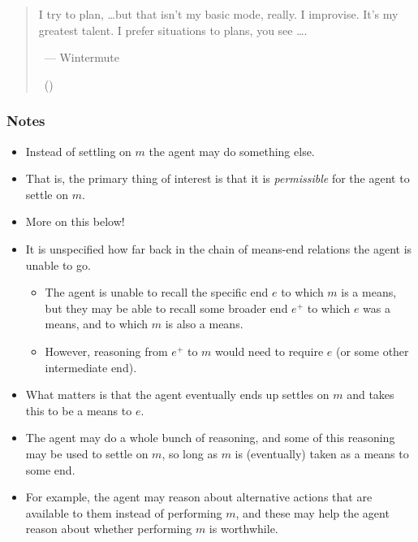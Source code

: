 \documentclass[10pt]{article}
\newcommand{\hozline}[0]{%
  \noindent\hdashrule[0.5ex][c]{\textwidth}{.1pt}{}
}
\newcommand{\hozlinedash}[0]{%
  \noindent\hdashrule[0.5ex][c]{\textwidth}{.1pt}{2.5pt}
}
\begin{document}
\hozlinedash

\begin{quote}
  I try to plan, \dots but that isn't my basic mode, really.
  I improvise.
  It’s my greatest talent.
  I prefer situations to plans, you see \dots.

  \mbox{ }\hfill --- Wintermute

  \mbox{ }\hfill\mbox{(\cite[118]{Gibson:2000aa})}
\end{quote}

\hozline

\subsubsection*{Notes}
\label{sec:notes}

\begin{itemize}
\item Instead of settling on \(m\) the agent may do something else.
\item That is, the primary thing of interest is that it is \emph{permissible} for the agent to settle on \(m\).
\item More on this below!
\end{itemize}


\begin{itemize}
\item It is unspecified how far back in the chain of means-end relations the agent is unable to go.
  \begin{itemize}
  \item The agent is unable to recall the specific end \(e\) to which \(m\) is a means, but they may be able to recall some broader end \(e^{+}\) to which \(e\) was a means, and to which \(m\) is also a means.
  \item However, reasoning from \(e^{+}\) to \(m\) would need to require \(e\) (or some other intermediate end).
  \end{itemize}
\end{itemize}

\begin{itemize}
\item What matters is that the agent eventually ends up settles on \(m\) and takes this to be a means to \(e\).
\item The agent may do a whole bunch of reasoning, and some of this reasoning may be used to settle on \(m\), so long as \(m\) is (eventually) taken as a means to some end.
\item For example, the agent may reason about alternative actions that are available to them instead of performing \(m\), and these may help the agent reason about whether performing \(m\) is worthwhile.
\end{itemize}
\end{document}
